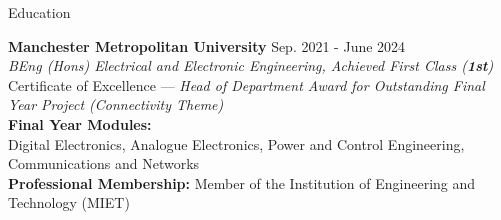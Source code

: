 \begin{rSection}{\normalsize Education}

{\bf Manchester Metropolitan University} \hfill {Sep. 2021 - June 2024}
\\ 
\textit {BEng (Hons) Electrical and Electronic Engineering, Achieved First Class (\textbf{1st})} 
\\
Certificate of Excellence — \textit{Head of Department Award for Outstanding Final Year Project (Connectivity Theme)}
\vspace{0.08cm}
\\
\textbf{Final Year Modules:} 
\\
Digital Electronics, Analogue Electronics, Power and Control Engineering, Communications and Networks
\vspace{0.1cm}
\\
\textbf{Professional Membership:} Member of the Institution of Engineering and Technology (MIET)
\end{rSection} 
\vspace{-0.2cm}